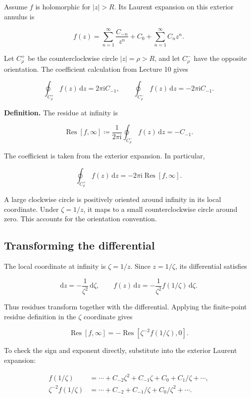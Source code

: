 \documentclass[11pt,a4paper]{article}
\theoremstyle{definition}
\theoremstyle{plain}
\begin{document}
Assume $f$ is holomorphic for $|z|>R$. Its Laurent expansion on this exterior annulus is

\[
f(z)=\sum_{n=1}^{\infty}\frac{C_{-n}}{z^n}+C_0+\sum_{n=1}^{\infty}C_nz^n.
\]

Let $C_\rho^+$ be the counterclockwise circle $|z|=\rho>R$, and let $C_\rho^-$ have the opposite orientation. The coefficient calculation from Lecture 10 gives

\[
\oint_{C_\rho^+}f(z)\,\mathrm{d}z=2\pi\mathrm{i}C_{-1},
\qquad
\oint_{C_\rho^-}f(z)\,\mathrm{d}z=-2\pi\mathrm{i}C_{-1}.
\]

\textbf{Definition.} The residue at infinity is

\[
\operatorname{Res}[f,\infty]\coloneqq
\frac1{2\pi\mathrm{i}}\oint_{C_\rho^-}f(z)\,\mathrm{d}z
=-C_{-1}.
\]

The coefficient is taken from the exterior expansion. In particular,

\[
\oint_{C_\rho^+}f(z)\,\mathrm{d}z=-2\pi\mathrm{i}\operatorname{Res}[f,\infty].
\]

A large clockwise circle is positively oriented around infinity in its local coordinate. Under $\zeta=1/z$, it maps to a small counterclockwise circle around zero. This accounts for the orientation convention.

\subsection{Transforming the differential}

The local coordinate at infinity is $\zeta=1/z$. Since $z=1/\zeta$, its differential satisfies

\[
\mathrm{d}z=-\frac1{\zeta^2}\,\mathrm{d}\zeta,
\qquad
f(z)\,\mathrm{d}z=-\frac1{\zeta^2}f(1/\zeta)\,\mathrm{d}\zeta.
\]

Thus residues transform together with the differential. Applying the finite-point residue definition in the $\zeta$ coordinate gives

\[
\operatorname{Res}[f,\infty]
=-\operatorname{Res}\left[\zeta^{-2}f(1/\zeta),0\right].
\]

To check the sign and exponent directly, substitute into the exterior Laurent expansion:

\[
\begin{aligned}
f(1/\zeta)&=\cdots+C_{-2}\zeta^2+C_{-1}\zeta+C_0+C_1/\zeta+\cdots,\\
\zeta^{-2}f(1/\zeta)&=\cdots+C_{-2}+C_{-1}/\zeta+C_0/\zeta^2+\cdots.
\end{aligned}
\]
\end{document}

